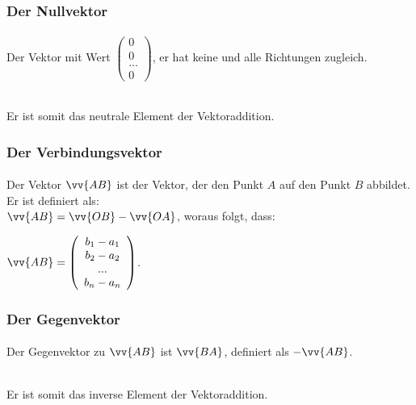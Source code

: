         \subsubsection{Der Nullvektor}

            \paragraph{} Der Vektor mit Wert $\left(\begin{array}{c} 0 \\ 0 \\ ...\\0\end{array}\right)$, er hat keine und alle Richtungen zugleich.
            \begin{Bemerkung}
                \\
                Er ist somit das neutrale Element der Vektoraddition.
            \end{Bemerkung}

        \subsubsection{Der Verbindungsvektor}

            \paragraph{} Der Vektor $\vv{AB}$ ist der Vektor, der den Punkt $A$ auf den Punkt $B$ abbildet. Er ist definiert als:\\ $\vv{AB}=\vv{OB}-\vv{OA}$,
             woraus folgt, dass: \begin{center} $\vv{AB} = \left(\begin{array}{c} b_1 - a_1 \\ b_2 - a_2 \\ ... \\ b_n - a_n \end{array}\right)$. \end{center}

        \subsubsection{Der Gegenvektor}

            \paragraph{} Der Gegenvektor zu $\vv{AB}$ ist $\vv{BA}$, definiert als  $-\vv{AB}$.
            \\
            \begin{Bemerkung}
                \\
                Er ist somit das inverse Element der Vektoraddition.
            \end{Bemerkung}

